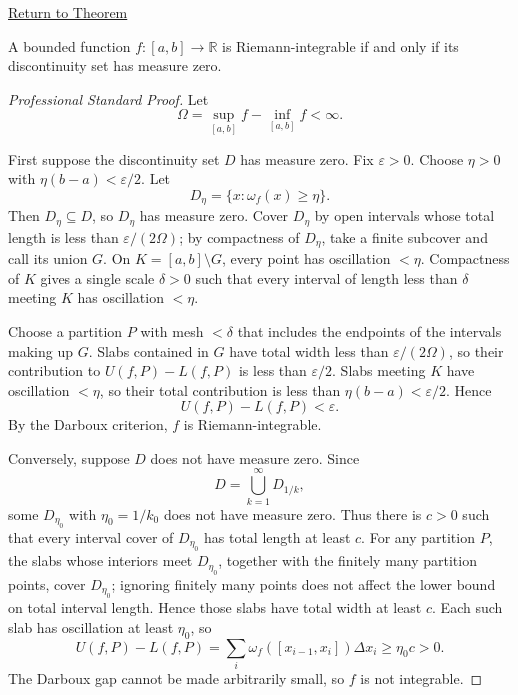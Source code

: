 \newpage
{}
\label{prf:lebesgue-criterion-riemann-integrability}
\begin{remark*}[Return]\hyperref[thm:lebesgue-criterion-riemann-integrability]{Return to Theorem}\end{remark*}
\begin{theorem*}
A bounded function \(f:[a,b]\to\mathbb R\) is Riemann-integrable if and only
if its discontinuity set has measure zero.
\end{theorem*}
\begin{proof}[Professional Standard Proof]
\LRAProofBodyStart
Let
\[
  \Omega=\sup_{[a,b]}f-\inf_{[a,b]}f<\infty.
\]

First suppose the discontinuity set \(D\) has measure zero. Fix
\(\varepsilon>0\). Choose \(\eta>0\) with \(\eta(b-a)<\varepsilon/2\). Let
\[
  D_\eta=\{x:\omega_f(x)\ge \eta\}.
\]
Then \(D_\eta\subseteq D\), so \(D_\eta\) has measure zero. Cover \(D_\eta\)
by open intervals whose total length is less than \(\varepsilon/(2\Omega)\);
by compactness of \(D_\eta\), take a finite subcover and call its union \(G\).
On \(K=[a,b]\setminus G\), every point has oscillation \(<\eta\). Compactness
of \(K\) gives a single scale \(\delta>0\) such that every interval of length
less than \(\delta\) meeting \(K\) has oscillation \(<\eta\).

Choose a partition \(P\) with mesh \(<\delta\) that includes the endpoints of
the intervals making up \(G\). Slabs contained in \(G\) have total width less
than \(\varepsilon/(2\Omega)\), so their contribution to \(U(f,P)-L(f,P)\) is
less than \(\varepsilon/2\). Slabs meeting \(K\) have oscillation \(<\eta\), so
their total contribution is less than \(\eta(b-a)<\varepsilon/2\). Hence
\[
  U(f,P)-L(f,P)<\varepsilon.
\]
By the Darboux criterion, \(f\) is Riemann-integrable.

Conversely, suppose \(D\) does not have measure zero. Since
\[
  D=\bigcup_{k=1}^{\infty}D_{1/k},
\]
some \(D_{\eta_0}\) with \(\eta_0=1/k_0\) does not have measure zero. Thus
there is \(c>0\) such that every interval cover of \(D_{\eta_0}\) has total
length at least \(c\). For any partition \(P\), the slabs whose interiors meet
\(D_{\eta_0}\), together with the finitely many partition points, cover
\(D_{\eta_0}\); ignoring finitely many points does not affect the lower bound
on total interval length. Hence those slabs have total width at least \(c\).
Each such slab has oscillation at least \(\eta_0\), so
\[
  U(f,P)-L(f,P)
  =\sum_i \omega_f([x_{i-1},x_i])\Delta x_i
  \ge \eta_0 c>0.
\]
The Darboux gap cannot be made arbitrarily small, so \(f\) is not integrable.
\end{proof}
